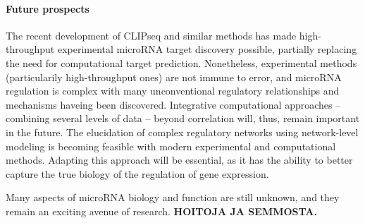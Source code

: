 \paragraph{Future prospects}

The recent development of CLIPseq and similar methods has made high-throughput
experimental microRNA target discovery possible, partially replacing the need
for computational target prediction. Nonetheless, experimental methods
(particularily high-throughput ones) are not immune to error, and microRNA
regulation is complex with many unconventional regulatory relationships and
mechanisms haveing been discovered. Integrative computational approaches --
combining several levels of data -- beyond correlation will, thus, remain
important in the future. The elucidation of complex regulatory networks using
network-level modeling is becoming feasible with modern experimental and
computational methods. Adapting this approach will be essential, as it has the
ability to better capture the true biology of the regulation of gene
expression.

Many aspects of microRNA biology and function are still unknown, and they 
remain an exciting avenue of research. \textbf{HOITOJA JA SEMMOSTA.}